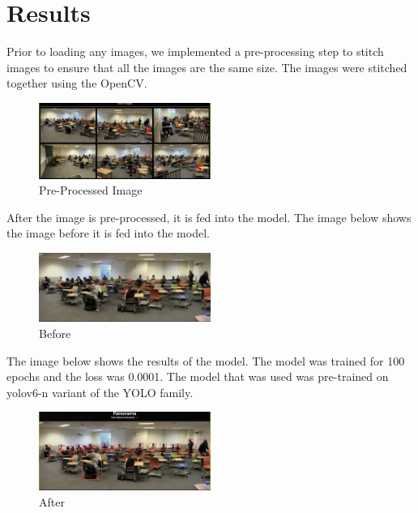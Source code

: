 \section{Results}
\label{sec:results}

Prior to loading any images, we implemented a pre-processing step to stitch images to ensure that all the images are the same size. The images were stitched together using the OpenCV.
\begin{figure}[h]
    \centering
    \includegraphics[width=0.5\textwidth]{images/Pre.png}
    \caption{Pre-Processed Image}
    \label{fig:before}
\end{figure}

After the image is pre-processed, it is fed into the model. The image below shows the image before it is fed into the model.
\begin{figure}[h]
    \centering
    \includegraphics[width=0.5\textwidth]{images/Before.png}
    \caption{Before}
    \label{fig:before}
\end{figure}

The image below shows the results of the model. The model was trained for 100 epochs and the loss was 0.0001. The model that was used was pre-trained on yolov6-n variant of the YOLO family. 

\begin{figure}[h]
    \centering
    \includegraphics[width=0.5\textwidth]{images/After.png}
    \caption{After}
    \label{fig:after}
\end{figure}

